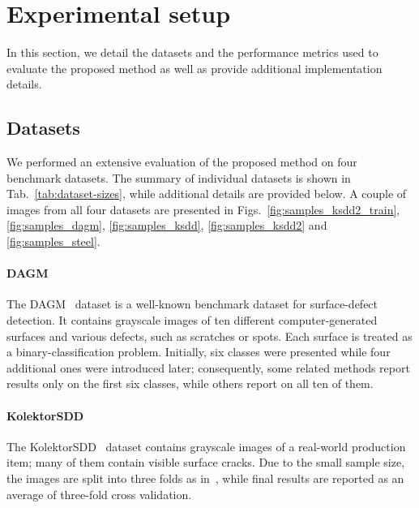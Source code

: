 \section{Experimental setup} \label{sec:experiment-setup}

In this section, we detail the datasets and the performance metrics used to evaluate the proposed method as well as provide additional implementation details.

\subsection{Datasets} \label{sec:datasets}

We performed an extensive evaluation of the proposed method on four benchmark datasets. The summary of individual datasets is shown in Tab.~\ref{tab:dataset-sizes}, while additional details are provided below. A couple of images from all four datasets are presented in Figs.~\ref{fig:samples_ksdd2_train}, \ref{fig:samples_dagm}, \ref{fig:samples_ksdd}, \ref{fig:samples_ksdd2} and \ref{fig:samples_steel}.

\paragraph{\textbf{DAGM}}
The DAGM~\cite{Weimer2016} dataset is a well-known benchmark dataset for surface-defect detection. 
It contains grayscale images of ten different computer-generated surfaces and various defects, such as scratches or spots.
Each surface is treated as a binary-classification problem. Initially, six classes were presented while four additional ones were introduced later; consequently, some related methods report results only on the first six classes, while others report on all ten of them. 

\paragraph{\textbf{KolektorSDD}}
The KolektorSDD~\cite{Tabernik2019JIM} dataset contains grayscale images of a real-world production item; many of them contain visible surface cracks. Due to the small sample size, the images are split into three folds as in~\cite{Tabernik2019JIM}, while final results are reported as an average of three-fold cross validation.

